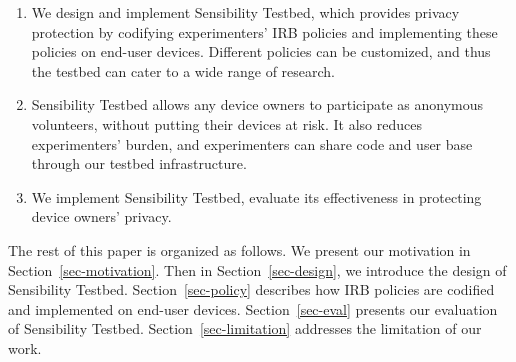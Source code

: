 \begin{enumerate}

\item We design and implement Sensibility Testbed, which provides privacy protection by 
codifying experimenters' IRB policies and implementing 
these policies on end-user devices. Different policies can 
be customized, and thus the testbed can cater to a wide 
range of research.


\item Sensibility Testbed allows any device owners to participate 
as anonymous volunteers, without putting their devices at risk. 
It also reduces experimenters' burden, and experimenters can share 
code and user base through our testbed infrastructure.


\item We implement Sensibility Testbed, evaluate its effectiveness
in protecting device owners' privacy. 
\end{enumerate}

The rest of this paper is organized as follows. We present our
motivation in Section~\ref{sec-motivation}. Then in Section~\ref{sec-design}, 
we introduce the design of Sensibility Testbed. Section~\ref{sec-policy}
describes how IRB policies are codified and implemented on end-user
devices. Section~\ref{sec-eval} presents our evaluation of Sensibility 
Testbed. Section~\ref{sec-limitation} addresses the limitation of our work.
